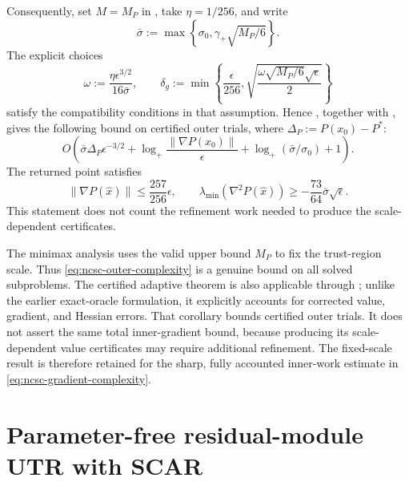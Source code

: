 \documentclass{article}
\begin{document}
Consequently, set $M=M_P$ in
, take $\eta=1/256$, and write
\[
 \bar\sigma:=\max\left\{\sigma_0,
  \gamma_+\sqrt{M_P/6}\right\}.
\]
The explicit choices
\begin{equation}\label{eq:ncsc-adaptive-explicit-errors}
 \omega:=\frac{\eta\epsilon^{3/2}}{16\bar\sigma},
 \qquad
 \delta_g:=\min\left\{
  \frac\epsilon{256},
  \sqrt{\frac{\omega\sqrt{M_P/6}\sqrt\epsilon}{2}}
 \right\}
\end{equation}
satisfy the compatibility conditions in that assumption.  Hence
, together with
, gives
the following bound on certified outer trials, where
$\Delta_P:=P(x_0)-P^*$:
\begin{equation}\label{eq:ncsc-adaptive-outer-complexity}
 O\!\left(
  \bar\sigma\Delta_P\epsilon^{-3/2}
  +\log_+\!\frac{\|\nabla P(x_0)\|}{\epsilon}
  +\log_+(\bar\sigma/\sigma_0)+1
 \right).
\end{equation}
The returned point satisfies
\begin{equation}\label{eq:ncsc-adaptive-return}
 \|\nabla P(\widehat x)\|
 \le\frac{257}{256}\epsilon,
 \qquad
 \lambda_{\min}(\nabla^2P(\widehat x))
 \ge-\frac{73}{64}\bar\sigma\sqrt\epsilon.
\end{equation}
This statement does not count the refinement work needed to produce
the scale-dependent certificates.

\begin{remark}
The minimax analysis uses the valid upper bound $M_P$ to fix the
trust-region scale.  Thus \eqref{eq:ncsc-outer-complexity} is a genuine
bound on all solved subproblems.  The certified adaptive theorem is
also applicable through ; unlike the
earlier exact-oracle formulation, it explicitly accounts for corrected
value, gradient, and Hessian errors.  That corollary bounds certified
outer trials.  It does not assert the same total inner-gradient bound,
because producing its scale-dependent value certificates may require
additional refinement.  The fixed-scale result is therefore retained
for the sharp, fully accounted inner-work estimate in
\eqref{eq:ncsc-gradient-complexity}.
\end{remark}

\section{Parameter-free residual-module UTR with SCAR}
\label{sec:pf-scar-utr}
\end{document}
